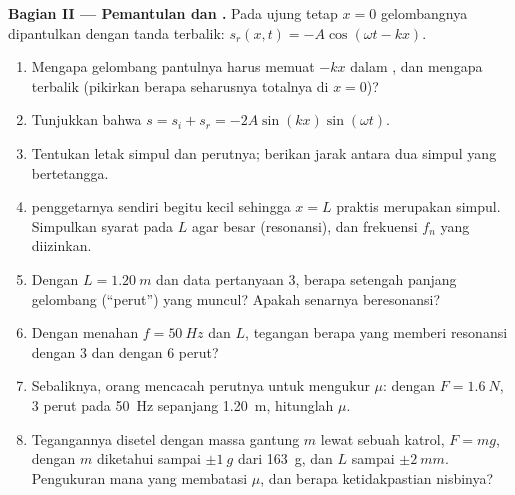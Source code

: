 \begin{problem}
\medskip
\noindent\textbf{Bagian II --- Pemantulan dan .}
Pada ujung tetap $x = 0$ gelombangnya dipantulkan dengan tanda terbalik:
$s_r(x, t) = -A\cos(\omega t - kx)$.
\begin{enumerate}[resume]
  \item Mengapa gelombang pantulnya harus memuat $-kx$ dalam ,
        dan mengapa  terbalik (pikirkan berapa seharusnya
         totalnya di $x = 0$)?
  \item Tunjukkan bahwa $s = s_i + s_r = -2A\sin(kx)\sin(\omega t)$.
  \item Tentukan letak simpul dan perutnya; berikan jarak antara dua
        simpul yang bertetangga.
  \item {} penggetarnya sendiri begitu kecil sehingga $x = L$
        praktis merupakan simpul. Simpulkan syarat pada $L$ agar
         besar (resonansi), dan frekuensi $f_n$ yang
        diizinkan.
  \item Dengan $L = \qty{1.20}{m}$ dan data pertanyaan 3, berapa
        setengah panjang gelombang (``perut'') yang muncul? Apakah
        senarnya beresonansi?
  \item Dengan menahan $f = \qty{50}{Hz}$ dan $L$, tegangan berapa yang
        memberi resonansi dengan $3$ dan dengan $6$ perut?
  \item Sebaliknya, orang mencacah perutnya untuk mengukur $\mu$: dengan
        $F = \qty{1.6}{N}$, $3$ perut pada \qty{50}{Hz} sepanjang \qty{1.20}{m},
        hitunglah $\mu$.
  \item Tegangannya disetel dengan massa gantung $m$ lewat sebuah
        katrol, $F = mg$, dengan $m$ diketahui sampai $\pm\qty{1}{g}$
        dari \qty{163}{g}, dan $L$ sampai $\pm\qty{2}{mm}$. Pengukuran
        mana yang membatasi $\mu$, dan berapa ketidakpastian nisbinya?
\end{enumerate}


\end{problem}
